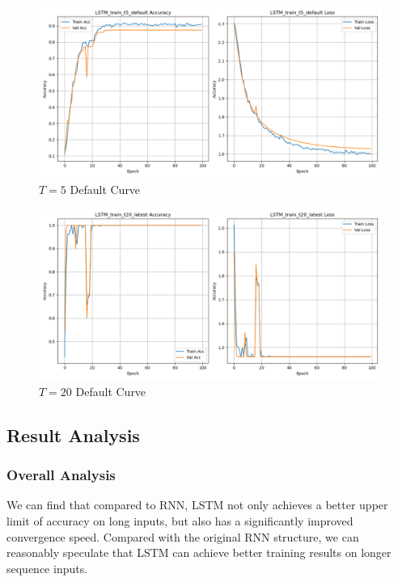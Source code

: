 \documentclass{article}
\begin{document}
\begin{figure}[!htbp]
    \centering
    \includegraphics[width=1\textwidth]{img/part1/LSTM_train_t5_default.png}
    \caption{$T = 5$ Default Curve}
    \label{fig:p1_t5_default}
\end{figure}

\begin{figure}[!htbp]
    \centering
    \includegraphics[width=1\textwidth]{img/part1/LSTM_train_t20_default.png}
    \caption{$T = 20$ Default Curve}
    \label{fig:p1_t20_default}
\end{figure}

\subsection{Result Analysis}

\subsubsection{Overall Analysis}

We can find that compared to RNN, LSTM not only achieves a better upper limit of accuracy on long inputs, but also has a significantly improved convergence speed. Compared with the original RNN structure, we can reasonably speculate that LSTM can achieve better training results on longer sequence inputs.
\end{document}
